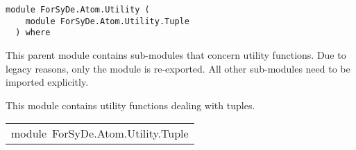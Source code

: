\label{module:ForSyDe.Atom.Utility}
\haddockbeginheader
{\haddockverb\begin{verbatim}
module ForSyDe.Atom.Utility (
    module ForSyDe.Atom.Utility.Tuple
  ) where\end{verbatim}}
\haddockendheader

This parent module contains sub-modules that concern utility
 functions. Due to legacy reasons, only the
  module is re-exported. All other
 sub-modules need to be imported explicitly.\par

This module contains utility functions dealing with tuples.\par

\begin{haddockdesc}
\item[\begin{tabular}{@{}l}
module\ ForSyDe.Atom.Utility.Tuple
\end{tabular}]
\end{haddockdesc}